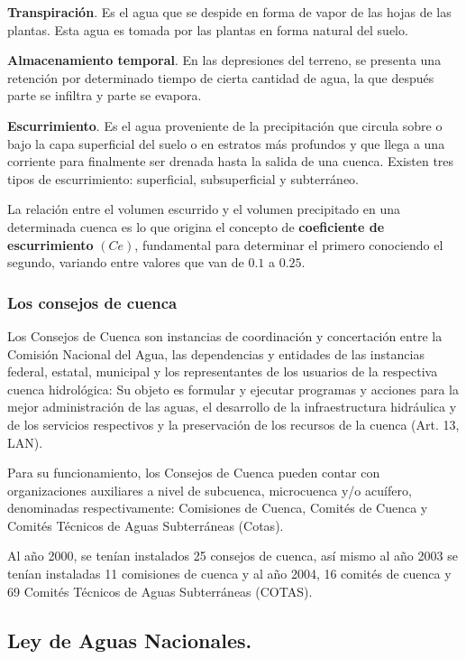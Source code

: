 \textbf{Transpiración}. Es el agua que se despide en forma de vapor de las hojas
de las plantas. Esta agua es tomada por las plantas en forma natural del suelo.

\textbf{Almacenamiento temporal}. En las depresiones del terreno, se presenta
una retención por determinado tiempo de cierta cantidad de agua, la que después parte
se infiltra y parte se evapora.

\textbf{Escurrimiento}. Es el agua proveniente de la precipitación que circula
sobre o bajo la capa superficial del suelo o en estratos más profundos y que llega a una
corriente para finalmente ser drenada hasta la salida de una cuenca. Existen tres tipos
de escurrimiento: superficial, subsuperficial y subterráneo.

La relación entre el volumen escurrido y el volumen precipitado en una
determinada cuenca es lo que origina el concepto de \textbf{coeficiente de escurrimiento} $(Ce)$,
fundamental para determinar el primero conociendo el segundo, variando entre valores
que van de $0.1$ a $0.25$.

\subsubsection{Los consejos de cuenca}
Los Consejos de Cuenca son instancias de coordinación y concertación entre la
Comisión Nacional del Agua, las dependencias y entidades de las instancias federal, estatal,
municipal y los representantes de los usuarios de la respectiva cuenca hidrológica: Su objeto es
formular y ejecutar programas y acciones para la mejor administración de las aguas, el
desarrollo de la infraestructura hidráulica y de los servicios respectivos y la preservación de los
recursos de la cuenca (Art. 13, LAN).

Para su funcionamiento, los Consejos de Cuenca pueden contar con organizaciones
auxiliares a nivel de subcuenca, microcuenca y/o acuífero, denominadas respectivamente:
Comisiones de Cuenca, Comités de Cuenca y Comités Técnicos de Aguas Subterráneas
(Cotas).


Al año 2000, se tenían instalados 25 consejos de cuenca, así mismo al año 2003
se tenían instaladas 11 comisiones de cuenca y al año 2004, 16 comités de cuenca y
69 Comités Técnicos de Aguas Subterráneas (COTAS).

\subsection{Ley de Aguas Nacionales.}

